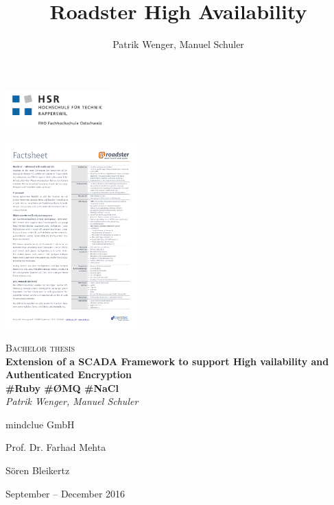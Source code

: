 \documentclass[a4paper]{report}
\title{Roadster High Availability}
\author{Patrik Wenger, Manuel Schuler}
\begin{document}


\thispagestyle{empty}

\begin{titlepage}
\centering
\begin{raggedleft}\includegraphics[trim=10 10 10 10, clip=true, width=0.3\textwidth]{img/hsr_logo.pdf}\end{raggedleft}
\begin{raggedright}\hfill\includegraphics[trim=14.8cm 27cm 1cm 1.4cm, clip=true, width=0.38\textwidth]{img/roadster_factsheet.pdf}\end{raggedright}

\vspace{50mm}
{\scshape\Large Bachelor thesis\\}
\vspace{2cm}
{\huge\bfseries Extension of a SCADA Framework to support High vailability and Authenticated Encryption\\}
\vspace{1cm}
{\huge\bfseries \#Ruby \#\O{}MQ \#NaCl\\}
\vspace{2cm}
{\Large\itshape Patrik Wenger, Manuel Schuler\\}
\vfill
\begin{center}
\begin{varwidth}{\textwidth}
\begin{description}
	\large
	\item [Client:] mindclue GmbH
	\item [Supervisor:] Prof. Dr. Farhad Mehta
	\item [Expert:] S\"oren Bleikertz
\end{description}
\end{varwidth}
\end{center}
\vfill
{\large September -- December 2016\\}
\end{titlepage}
\end{document}

